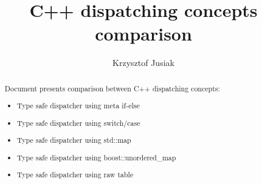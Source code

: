 \documentclass[12pt]{report}
\begin{document}
\date{}
\author{Krzysztof Jusiak}
\title{C++ dispatching concepts comparison}
\frenchspacing
\maketitle

\begin{abstract}
Document presents comparison between C++ dispatching concepts:
\begin{itemize}
\item Type safe dispatcher using meta if-else
\item Type safe dispatcher using switch/case
\item Type safe dispatcher using std::map
\item Type safe dispatcher using boost::unordered\_map
\item Type safe dispatcher using raw table
\end{itemize}
\end{abstract}

\clearpage
\tableofcontents



\end{document}
